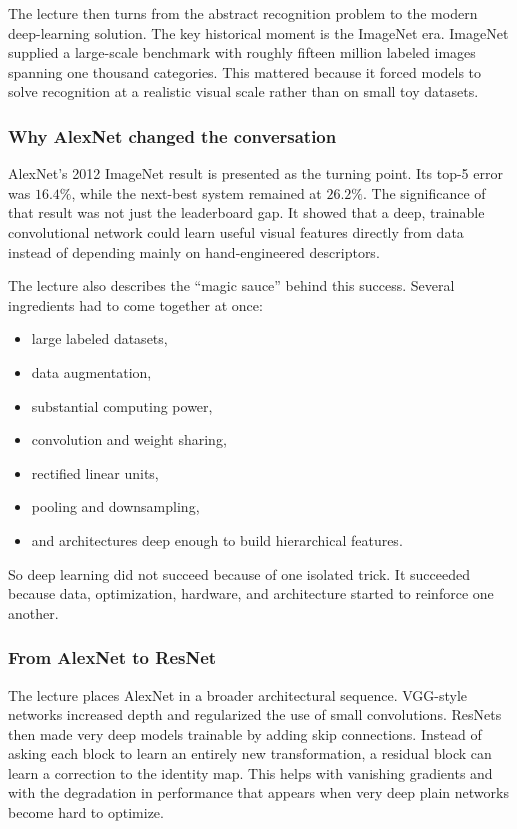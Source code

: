 The lecture then turns from the abstract recognition problem to the modern deep-learning solution. The key historical moment is the ImageNet era. ImageNet supplied a large-scale benchmark with roughly fifteen million labeled images spanning one thousand categories. This mattered because it forced models to solve recognition at a realistic visual scale rather than on small toy datasets.

\subsubsection{Why AlexNet changed the conversation}

AlexNet's 2012 ImageNet result is presented as the turning point. Its top-5 error was \(16.4\%\), while the next-best system remained at \(26.2\%\). The significance of that result was not just the leaderboard gap. It showed that a deep, trainable convolutional network could learn useful visual features directly from data instead of depending mainly on hand-engineered descriptors.

The lecture also describes the ``magic sauce'' behind this success. Several ingredients had to come together at once:
\begin{itemize}
    \item large labeled datasets,
    \item data augmentation,
    \item substantial computing power,
    \item convolution and weight sharing,
    \item rectified linear units,
    \item pooling and downsampling,
    \item and architectures deep enough to build hierarchical features.
\end{itemize}

So deep learning did not succeed because of one isolated trick. It succeeded because data, optimization, hardware, and architecture started to reinforce one another.

\subsubsection{From AlexNet to ResNet}

The lecture places AlexNet in a broader architectural sequence. VGG-style networks increased depth and regularized the use of small convolutions. ResNets then made very deep models trainable by adding skip connections. Instead of asking each block to learn an entirely new transformation, a residual block can learn a correction to the identity map. This helps with vanishing gradients and with the degradation in performance that appears when very deep plain networks become hard to optimize.

